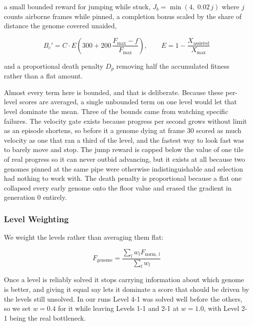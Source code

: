 \noindent
a small bounded reward for jumping while stuck,
$J_{b} = \min(4,\; 0.02\,j)$ where $j$ counts airborne frames while pinned, a
completion bonus scaled by the share of distance the genome covered unaided,

\begin{equation}
    B_{c}' = C \cdot E \left( 300 + 200\,\frac{F_{\max} - f}{F_{\max}} \right),
    \qquad
    E = 1 - \frac{X_{\text{assisted}}}{X_{\max}}
    \label{eq:completion-norm}
\end{equation}

\noindent
and a proportional death penalty $D_{p}$ removing half the accumulated fitness
rather than a flat amount.

\noindent
Almost every term here is bounded, and that is deliberate. Because these
per-level scores are averaged, a single unbounded term on one level would let
that level dominate the mean. Three of the bounds came from watching specific
failures. The velocity gate exists because progress per second grows without
limit as an episode shortens, so before it a genome dying at frame 30 scored as
much velocity as one that ran a third of the level, and the fastest way to look
fast was to barely move and stop. The jump reward is capped below the value of
one tile of real progress so it can never outbid advancing, but it exists at
all because two genomes pinned at the same pipe were otherwise indistinguishable
and selection had nothing to work with. The death penalty is proportional
because a flat one collapsed every early genome onto the floor value and erased
the gradient in generation 0 entirely.

\subsubsection{Level Weighting}

We weight the levels rather than averaging them flat:

\begin{equation}
    F_{\text{genome}} = \frac{\sum_{l} w_{l} F_{\text{norm},\,l}}{\sum_{l} w_{l}}
    \label{eq:weighted-mean}
\end{equation}

\noindent
Once a level is reliably solved it stops carrying information about which
genome is better, and giving it equal say lets it dominate a score that should
be driven by the levels still unsolved. In our runs Level 4-1 was solved well
before the others, so we set $w = 0.4$ for it while leaving Levels 1-1 and 2-1
at $w = 1.0$, with Level 2-1 being the real bottleneck.

